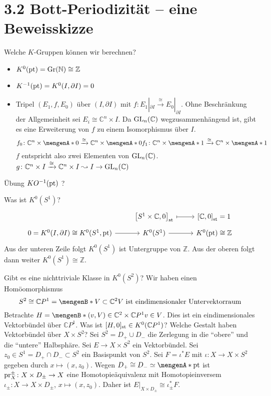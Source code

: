 \newpage
\section*{3.2 Bott-Periodizität -- eine Beweisskizze}
Welche $K$-Gruppen können wir berechnen? 
\begin{itemize}
	\item $K^0(\mathrm{pt}) = \operatorname{Gr}(\mathbb{N}) \cong \mathbb{Z} $
	\item $K^{-1}(\mathrm{pt}) = K^0(I,\partial I) = 0$
	\item Tripel $(E_1,f,E_0)$ über $(I,\partial I)$ mit $f \colon E_1|_{\partial I} \xrightarrow{\cong} E_0|_{\partial I}$. Ohne Beschränkung der Allgemeinheit sei 
	$E_i \cong \mathds{C}^n \times I$. Da $\operatorname{GL}_n(\mathbb{C})$ wegzusammenhängend ist, gibt es eine Erweiterung von $f$ zu einem Isomorphismus über $I$. 
	\[
		f_0 \colon \mathds{C}^n \times \set{0} \xrightarrow{\cong} \mathds{C}^n \times \set{0} \\
		f_1 \colon \mathds{C}^n \times \set{1} \xrightarrow{\cong} \mathds{C}^n \times \set{1}     
	\]
	$f$ entspricht also zwei Elementen von $\operatorname{GL}_n(\mathbb{C})$. $g \colon \mathbb{C}^n \times I \xrightarrow{\cong}  \mathbb{C}^n \times I \leadsto I \to \operatorname{GL}_n(\mathbb{C})$ 
\end{itemize}
Übung $KO ^{-1}(\mathrm{pt})$ ?

Was ist $K^0(S^1)$? 
\[
	\begin{tikzcd}[row sep=0.4em] 
		& \benbrace*{S^1 \times \mathds{C},0}_\st \rar[mapsto] & \benbrace*{\mathds{C},0}_\st = 1  \\
		0=K^0(I,\partial I) \cong K^0(S^1,\pt) \rar & K^0(S^1) \rar & K^0(\pt) \cong \mathds{Z}
	\end{tikzcd}
\]
Aus der unteren Zeile folgt $ K^0(S^1)$ ist Untergruppe von $\mathds{Z}$. Aus der oberen folgt dann weiter $K^0(S^1)\cong \mathds{Z}$.

Gibt es eine nichttriviale Klasse in $K^0(S^2)$? Wir haben einen Homöomorphismus 
\[
	S^2 \cong \mathds{C}P^1 = \set[V \subset \mathds{C}^2]{V \text{ ist eindimensionaler Untervektorraum}} 
\]
Betrachte $H= \set[(v,V) \in \mathds{C}^2 \times \mathds{C}P^1]{v \in V} $. Dies ist ein eindimensionales Vektorbündel über $\mathds{C}P^1$. Was ist 
$[H,0]_{\mathrm{st}} \in K^0(\mathbb{C}P^1)$? Welche Gestalt haben Vektorbündel über $X \times S^2$? Sei $S^2= D_+ \cup D_-$ die Zerlegung in die \enquote{obere} und die 
\enquote{untere} Halbsphäre. Sei $E \to X \times S^2$ ein Vektorbündel. Sei $z_0 \in S^1= D_+ \cap D_- \subset S^2$ ein Basispunkt von $S^2$. Sei 
$F= \iota^* E$ mit $\iota \colon X \to X \times S^2$ gegeben durch $x \mapsto(x,z_0)$. Wegen $D_+ \cong D_- \simeq \set{\pt}$ ist $\mathrm{pr}_X^\pm \colon X \times D_{\pm} \to X$
eine Homotopieäquivalenz mit Homotopieinversem $\iota_{\pm} \colon X \to X \times D_\pm$, $x \mapsto (x,z_0)$. Daher ist $E|_{X \times D_\pm} \cong \iota_\pm^*F$.

